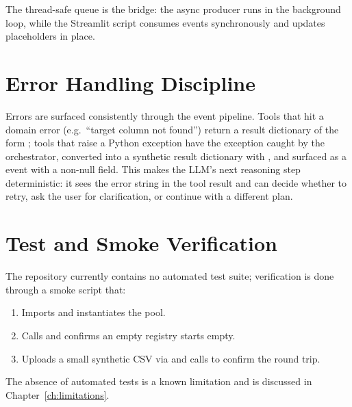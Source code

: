 The thread-safe queue is the bridge: the async producer runs in the
background loop, while the Streamlit script consumes events
synchronously and updates placeholders in place.

\section{Error Handling Discipline}
\label{sec:errors-impl}

Errors are surfaced consistently through the event pipeline. Tools
that hit a domain error (e.g.\ ``target column not found'') return a
result dictionary of the form ; tools
that raise a Python exception have the exception caught by the
orchestrator, converted into a synthetic result dictionary with
, and surfaced as a
 event with a non-null  field. This
makes the LLM's next reasoning step deterministic: it sees the
error string in the tool result and can decide whether to retry, ask
the user for clarification, or continue with a different plan.

\section{Test and Smoke Verification}
\label{sec:tests-impl}

The repository currently contains no automated test suite;
verification is done through a smoke script that:

\begin{enumerate}[leftmargin=1.4em]
  \item Imports and instantiates the pool.
  \item Calls  and confirms an empty
        registry starts empty.
  \item Uploads a small synthetic CSV via
         and calls
         to confirm the round trip.
\end{enumerate}

The absence of automated tests is a known limitation and is discussed
in Chapter~\ref{ch:limitations}.

